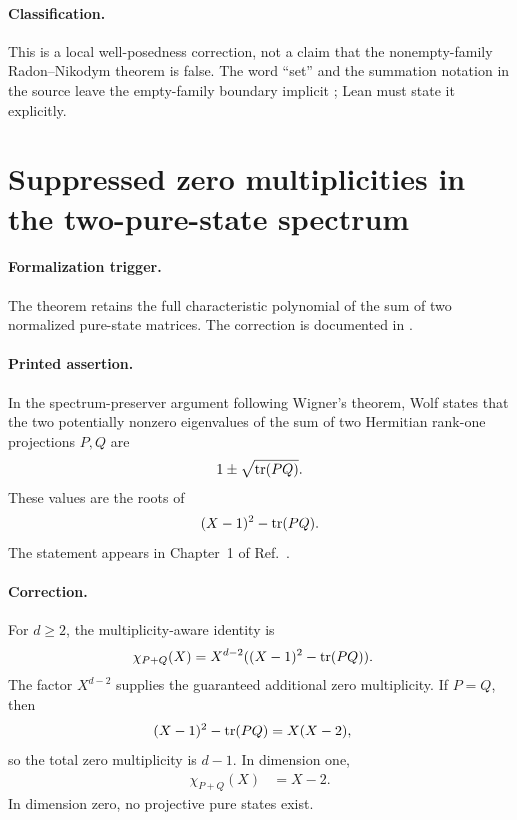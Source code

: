 \documentclass{article}
\begin{document}
\paragraph{Classification.}
This is a local well-posedness correction, not a claim that the
nonempty-family Radon--Nikodym theorem is false. The word ``set'' and the
summation notation in the source leave the empty-family boundary implicit
\cite{Wolf2012Quantum}; Lean must state it explicitly.

\section{Suppressed zero multiplicities in the two-pure-state spectrum}
\label{sec:two-pure-state-spectrum}

\paragraph{Formalization trigger.}
The theorem
 retains the
full characteristic polynomial of the sum of two normalized pure-state
matrices. The correction is documented in
.

\paragraph{Printed assertion.}
In the spectrum-preserver argument following Wigner's theorem, Wolf states
that the two potentially nonzero eigenvalues of the sum of two Hermitian
rank-one projections $P,Q$ are
\begin{align}
    1\pm\sqrt{\operatorname{tr}(PQ)}.
    \label{eq:wolf_lecture_notes_errata_two_pure_state_printed_values}
\end{align}
These values are the roots of
\begin{align}
    (X-1)^2-\operatorname{tr}(PQ).
    \label{eq:wolf_lecture_notes_errata_two_pure_state_quadratic}
\end{align}
The statement appears in Chapter~1 of Ref.~\cite{Wolf2012Quantum}.

\paragraph{Correction.}
For $d\geq2$, the multiplicity-aware identity is
\begin{align}
    \chi_{P+Q}(X)
        &=X^{d-2}((X-1)^2-\operatorname{tr}(PQ)).
    \label{eq:wolf_lecture_notes_errata_two_pure_state_charpoly}
\end{align}
The factor $X^{d-2}$ supplies the guaranteed additional zero multiplicity. If
$P=Q$, then
\begin{align}
    (X-1)^2-\operatorname{tr}(PQ)
        &=X(X-2),
    \label{eq:wolf_lecture_notes_errata_two_pure_state_equal_projection_quadratic}
\end{align}
so the total zero multiplicity is $d-1$. In dimension one,
\begin{align}
    \chi_{P+Q}(X)
        &=X-2.
    \label{eq:wolf_lecture_notes_errata_two_pure_state_dimension_one}
\end{align}
In dimension zero, no projective pure states exist.
\end{document}
